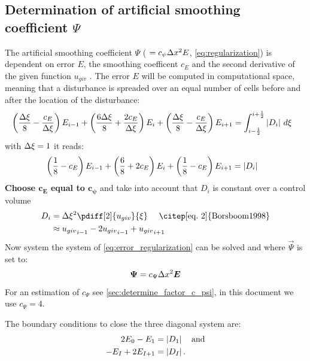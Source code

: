 \subsection{Determination of artificial smoothing coefficient $\Psi$}\label{sec:determine_psi}
The artificial smoothing coefficient $\Psi$ ( $ = c_{\psi} \Delta x^2 E$, \autoref{eq:regularization}) is dependent on error $E$, the smoothing coefficent $c_E$ and the second derivative of the given function $u_{giv}$ \citep[eq.\ 8]{Borsboom1998}.
The error $E$ will be computed in computational space, meaning that a disturbance is spreaded over an equal number of cells before and after the location of the disturbance:
%
\begin{align}
    &\left(\frac{\Delta \xi}{8}-\frac{c_E}{\Delta \xi}\right) E_{i-1} + \left(\frac{6\Delta \xi}{8} + \frac{2c_E}{\Delta \xi}\right) E_i + \left(\frac{\Delta \xi}{8} - \frac{c_E}{\Delta \xi}\right)E_{i+1}
    =  \int_{i-\frac{1}{2}}^{i+\frac{1}{2}} \left| D_i \right| \, d\xi
    \label{eq:error_regularization}
\end{align}
with $\Delta \xi =1$ it reads:
\begin{align}
    &\left(\frac{1}{8}-c_E\right) E_{i-1} + \left(\frac{6}{8} + 2c_E\right) E_i + \left(\frac{1}{8} - c_E\right)E_{i+1}
    =   \left| D_i \right|
    \label{eq:error_regularization}
\end{align}
\textbf{Choose $\mathbf{c_E}$ equal to $\mathbf{c_{\psi}}$} and take into account that $D_i$ is constant over a control volume
\begin{align}
    D_i & = \Dxi^2 \pdiff[2]{u_{giv}}{\xi} \quad \text{ \citep[eq.\ 2]{Borsboom1998}}
    \\ & \approx {u_{giv}}_{i-1} - 2 {u_{giv}}_{i-1} + {u_{giv}}_{i+1}
\end{align}
%
Now system the system of \autoref{eq:error_regularization} can be solved and where $\vec{\Psi}$ is set to:
\begin{align}
    \mbox{\boldmath $\Psi$} = c_{\Psi}\Delta x^2 \mbox{\boldmath $E$}
\end{align}
For an estimation of $c_{\Psi}$ see \autoref{sec:determine_factor_c_psi}, in this document we use $c_{\Psi} = 4$.

The boundary conditions to close the three diagonal system are:
\begin{align}
    2 E_0 - E_1 & = \left| D_{1} \right| \quad \text{and}
    \\
    - E_{I} + 2 E_{I+1} & = \left| D_{I} \right|.
\end{align}

